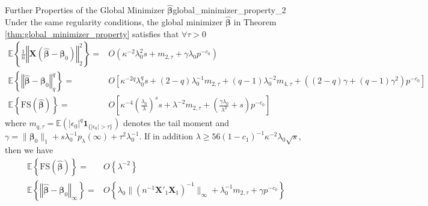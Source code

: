\documentclass[twoside]{article}
\begin{document}
\begin{theorem}{Further Properties of the Global Minimizer $\hat{\boldsymbol{\beta}}$}{global_minimizer_property_2}
    Under the same regularity conditions, the global minimizer $\hat{\boldsymbol{\beta}}$ in Theorem \ref{thm:global_minimizer_property} satisfies that $\forall \tau >0$
    \begin{align}
        \mathbb{E}\left\{ \frac{1}{n}\left\Vert \mathbf{X}\left( \hat{\boldsymbol{\beta}} -\boldsymbol{\beta}_0 \right) \right\Vert^2 _2 \right\} =& O\left(\kappa^{-2}\lambda^2_0s +m_{2,\tau}+\gamma \lambda_0p^{-c_0}\right) \\
        \mathbb{E}\left\{ \left\Vert \hat{\boldsymbol{\beta}}-\boldsymbol{\beta}_0 \right\Vert^q _q \right\} = &O\left[ \kappa^{-2q}\lambda_0^q s + (2-q)\lambda_0^{-1}m_{2,\tau}+(q-1)\lambda^{-2}_0m_{4,\tau} + \left( (2-q)\gamma + (q-1)\gamma^2 \right)p^{-c_0} \right] \\
        \mathbb{E}\left\{\mathrm{FS}\left(\hat{\boldsymbol{\beta}} \right) \right\} =& O\left[ \kappa^{-4}\left( \frac{\lambda_0}{\lambda} \right)^s s +\lambda^{-2}m_{2,\tau} + \left(\frac{\gamma\lambda_0}{\lambda^2}+s\right)p^{-c_0} \right]
    \end{align}
    where $m_{q,\tau}=\mathbb{E}\left( \lvert \epsilon_0 \rvert^q \mathbf{1}_{ \{\lvert \epsilon_0 \rvert>\tau \} } \right)$ denotes the tail moment and $\gamma = \lVert \boldsymbol{\beta}_0 \rVert _1 + s\lambda_0^{-1}p_{\lambda}(\infty) + \tau^2 \lambda_0^{-1}$. If in addition $\lambda\geq 56(1-c_1)^{-1}\kappa^{-2}\lambda_0 \sqrt{s}$, then we  have 
    \begin{align*}
        \mathbb{E}\left\{\mathrm{FS}\left(\hat{\boldsymbol{\beta}} \right) \right\} =& O\left\{ \lambda^{-2} \right\} \\
        \mathbb{E}\left\{ \left\Vert \hat{\boldsymbol{\beta}}-\boldsymbol{\beta}_0 \right\Vert _{\infty} \right\} =& O\left\{ \lambda_0 \lVert (n^{-1}\mathbf{X}'_1\mathbf{X}_1)^{-1} \rVert _{\infty} + \lambda_0^{-1}m_{2,\tau} + \gamma p^{-c_0} \right\}
    \end{align*}

\end{theorem}

\newpage


\end{document}
